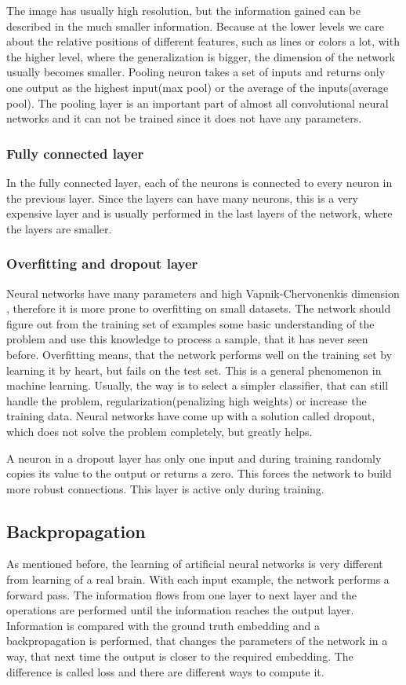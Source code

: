 \documentclass[a4paper,11pt,titlepage,twoside]{article}
\numberwithin{figure}{section}
\begin{document}
The image has usually high resolution, but the information gained can be described in the much smaller information. Because at the lower levels we care about the relative positions of different features, such as lines or colors a lot, with the higher level, where the generalization is bigger, the dimension of the network usually becomes smaller. Pooling neuron takes a set of inputs and returns only one output as the highest input(max pool) or the average of the inputs(average pool). The pooling layer\cite{scherer2010evaluation} is an important part of almost all convolutional neural networks and it can not be trained since it does not have any parameters.

\subsubsection{Fully connected layer}
In the fully connected layer, each of the neurons is connected to every neuron in the previous layer. Since the layers can have many neurons, this is a very expensive layer and is usually performed in the last layers of the network, where the layers are smaller. 

\subsubsection{Overfitting and dropout layer}
Neural networks have many parameters and high Vapnik-Chervonenkis dimension \cite{blumer1989learnability}, therefore it is more prone to overfitting on small datasets. The network should figure out from the training set of examples some basic understanding of the problem and use this knowledge to process a sample, that it has never seen before. Overfitting means, that the network performs well on the training set by learning it by heart, but fails on the test set. This is a general phenomenon in machine learning. Usually, the way is to select a simpler classifier, that can still handle the problem, regularization(penalizing high weights) or increase the training data. Neural networks have come up with a solution called dropout, which does not solve the problem completely, but greatly helps.

A neuron in a dropout layer has only one input and during training randomly copies its value to the output or returns a zero. This forces the network to build more robust connections. This layer is active only during training. 


\subsection{Backpropagation}
\label{sec:back-prop}
As mentioned before, the learning of artificial neural networks is very different from learning of a real brain. With each input example, the network performs a forward pass. The information flows from one layer to next layer and the operations are performed until the information reaches the output layer. Information is compared with the ground truth embedding and a backpropagation is performed, that changes the parameters of the network in a way, that next time the output is closer to the required embedding. The difference is called loss and there are different ways to compute it.
\end{document}

